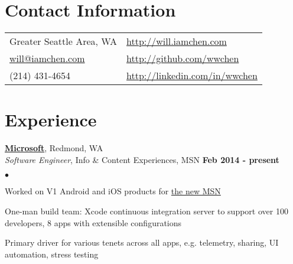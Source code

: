 \documentclass[margin,line]{res}
\newenvironment{list2}
  {\vspace{-4mm}
   \begin{list}{$\bullet$}{
     \setlength{\itemsep}{0in}
     \setlength{\parsep}{0in} \setlength{\parskip}{0in}
     \setlength{\topsep}{0in} \setlength{\partopsep}{0in}
     \setlength{\leftmargin}{0.18in}}}
  {\end{list}}
\begin{document}

\begin{resume}
\section{\sc Contact Information}
\begin{tabular}{@{}p{2.5in}p{4in}}
Greater Seattle Area, WA                           & \href{http://will.iamchen.com}{http://will.iamchen.com} \\
\href{mailto:will@iamchen.com}{will@iamchen.com}   & \href{http://github.com/wwchen}{http://github.com/wwchen} \\ 
(214) 431-4654                                     & \href{http://linkedin.com/in/wwchen}{http://linkedin.com/in/wwchen} \\
\end{tabular}

%
%
\section{\sc Experience}
{\bf \href{http://microsoft.com}{Microsoft}}, Redmond, WA \\
{\em Software Engineer}, Info \& Content Experiences, MSN                            \hfill {\bf Feb 2014 - present} \\
\begin{list2}
\item Worked on V1 Android and iOS products for \href{http://blogs.microsoft.com/blog/2014/09/07/first-look-new-msn/}{the new MSN}
\item One-man build team: Xcode continuous integration server to support over 100 developers, 8 apps with extensible configurations
\item Primary driver for various tenets across all apps, e.g. telemetry, sharing, UI automation, stress testing
\end{list2}


\end{resume}
\end{document}
